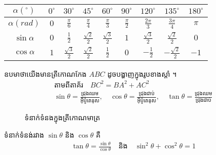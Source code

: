 \begin{center}
	\begin{tabular}{ | c | c | c | c | c | c | c | c | c | }
		\hline
		$\alpha\left(^\circ\right)$ & $0^\circ$ & $30^\circ$ & $45^\circ$ & $60^\circ$ & $90^\circ$ & $120^\circ$ & $135^\circ$ & $180^\circ$\\ \hline
		$\alpha\left(rad\right)$ & $0$ & $\frac{\pi}{6}$ & $\frac{\pi}{4}$ & $\frac{\pi}{3}$ & $\frac{\pi}{2}$ & $\frac{2\pi}{3}$ & $\frac{3\pi}{4}$ & $\pi$\\ \hline
		$\sin\alpha$ & $0$ & $\frac{1}{2}$ & $\frac{\sqrt{2}}{2}$ & $\frac{\sqrt{3}}{2}$ & $1$ & $\frac{\sqrt{3}}{2}$ & $\frac{\sqrt{2}}{2}$ & $0$\\ \hline
		$\cos\alpha$ & $1$ & $\frac{\sqrt{3}}{2}$ & $\frac{\sqrt{2}}{2}$ & $\frac{1}{2}$ & $0$ & $-\frac{1}{2}$ &$-\frac{\sqrt{2}}{2}$ & $-1$ \\
		\hline
	\end{tabular}
\end{center}
\begin{multicols}{2}
	ឧបមាថាយើងមានត្រីកោណកែង $ABC$ ដូចបង្ហាញក្នុងរូបខាងស្តាំ ។
	\begin{align*}
	\text{តាមពីតាគ័រ}\quad BC^{2}=BA^{2}+AC^{2}\\
	\sin\theta=\frac{\text{ជ្រុងឈម}}{\text{អុីប៉ូតេនុស}},\quad \cos\theta=\frac{\text{ជ្រុងជាប់}}{\text{អុីប៉ូតេនុស}},\quad \tan\theta=\frac{\text{ជ្រុងឈម}}{\text{ជ្រុងជាប់}}
	\end{align*}
	\begin{figure}[H]
		\centering
		\caption{ទំនាក់ទំនងក្នុងត្រីកោណមាត្រ}
	\end{figure}
\end{multicols}
ទំនាក់ទំនង់រវាង $\sin\theta$ និង $\cos\theta$ គឺ
\begin{align*}
\tan\theta=\frac{\sin\theta}{\cos\theta} \quad \text{និង}\quad \sin^{2}\theta+\cos^{2}\theta=1
\end{align*}
